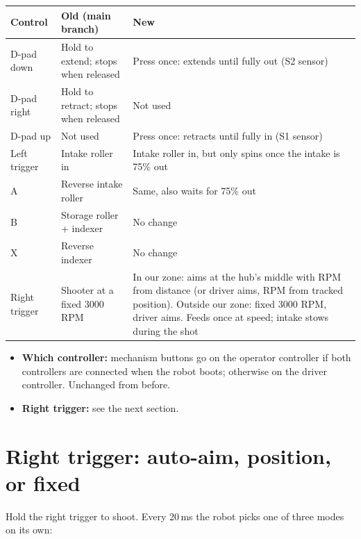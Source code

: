 \documentclass[11pt]{article}
\begin{document}
\begin{xltabular}{\linewidth}{>{\raggedright\arraybackslash}p{2.6cm} L L}
\toprule
\textbf{Control} & \textbf{Old (main branch)} & \textbf{New} \\
\midrule
\endhead
D-pad down    & Hold to extend; stops when released  & Press once: extends until fully out (S2 sensor) \\
D-pad right   & Hold to retract; stops when released & Not used \\
D-pad up      & Not used                             & Press once: retracts until fully in (S1 sensor) \\
Left trigger  & Intake roller in                     & Intake roller in, but only spins once the intake is 75\% out \\
A             & Reverse intake roller                & Same, also waits for 75\% out \\
B             & Storage roller + indexer             & No change \\
X             & Reverse indexer                      & No change \\
Right trigger & Shooter at a fixed 3000 RPM          & In our zone: aims at the hub's middle with RPM from distance (or driver aims, RPM from tracked position). Outside our zone: fixed 3000 RPM, driver aims. Feeds once at speed; intake stows during the shot \\
\bottomrule
\end{xltabular}

\begin{itemize}
  \item \textbf{Which controller:} mechanism buttons go on the operator controller if both
    controllers are connected when the robot boots; otherwise on the driver controller.
    Unchanged from before.
  \item \textbf{Right trigger:} see the next section.
\end{itemize}

\section*{Right trigger: auto-aim, position, or fixed}

Hold the right trigger to shoot. Every 20\,ms the robot picks one of three modes on its own:
\end{document}
